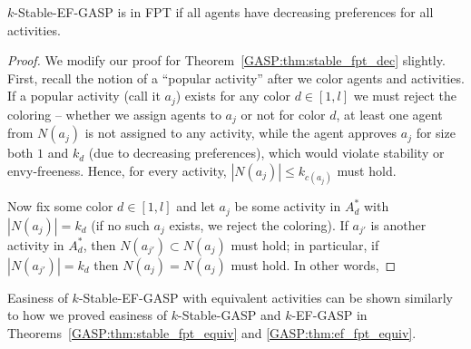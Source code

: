 \begin{theorem} \label{GASP:thm:stable_ef_dec_fpt}
$k$-Stable-EF-GASP is in FPT if all agents have decreasing preferences for all activities. 
\end{theorem} 
\begin{proof} 
We modify our proof for Theorem~\ref{GASP:thm:stable_fpt_dec} slightly.
First, recall the notion of a ``popular activity'' after we color agents and activities. If a popular activity (call it $a_j$) exists for any color $d\in [1,l]$ we must reject the coloring -- whether we assign agents to $a_j$ or not for color $d$, at least one agent from $N(a_j)$ is not assigned to any activity, while the agent approves $a_j$ for size both $1$ and $k_d$ (due to decreasing preferences), which would violate stability or envy-freeness. Hence, for every activity, $|N(a_j)| \leq k_{c(a_j)}$ must hold. 

Now fix some color $d\in [1,l]$ and let $a_j$ be some activity in $A^*_d$ with $|N(a_j)| = k_d$ (if no such $a_j$ exists, we reject the coloring). If $a_{j'}$ is another activity in $A^*_d$, then $N(a_{j'}) \subset N(a_j)$ must hold; in particular, if $|N(a_{j'})| = k_d$ then $N(a_{j}) = N(a_j)$ must hold. In other words, 
	
	
\end{proof}


Easiness of $k$-Stable-EF-GASP with equivalent activities can be shown similarly to how we proved easiness of $k$-Stable-GASP and $k$-EF-GASP in Theorems~\ref{GASP:thm:stable_fpt_equiv} and \ref{GASP:thm:ef_fpt_equiv}.

